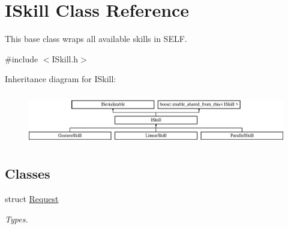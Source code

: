 \hypertarget{class_i_skill}{}\section{I\+Skill Class Reference}
\label{class_i_skill}


This base class wraps all available skills in S\+E\+LF.  




{\ttfamily \#include $<$I\+Skill.\+h$>$}

Inheritance diagram for I\+Skill\+:\begin{figure}[H]
\begin{center}
\leavevmode
\includegraphics[height=2.258065cm]{class_i_skill}
\end{center}
\end{figure}
\subsection*{Classes}
\begin{DoxyCompactItemize}
\item 
struct \hyperlink{struct_i_skill_1_1_request}{Request}
\begin{DoxyCompactList}\small\item\em Types. \end{DoxyCompactList}\end{DoxyCompactItemize}
